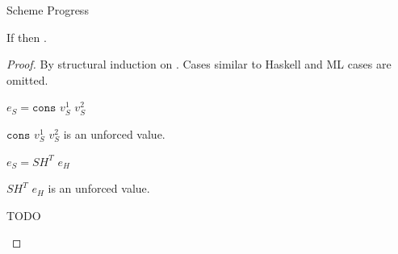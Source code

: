 \begin{theorem}{Scheme Progress}

\label{thmpss}

If \judes{}{\first{\varexps}}{\tytst} then \pshyp{\first{\varexps}}{\second{\varexps}}.

\begin{proof}

By structural induction on \first{\varexps}.  Cases similar to Haskell and ML cases are omitted.


\begin{case}

$e_{S}=\mathtt{cons}$ $v_{S}^{1}$ $v_{S}^{2}$

$\mathtt{cons}$ $v_{S}^{1}$ $v_{S}^{2}$ is an unforced value.

\end{case}


\begin{case}

$e_{S}=SH^{T}$ $e_{H}$

$SH^{T}$ $e_{H}$ is an unforced value.

TODO

\end{case}


\newcommand{\psfapps}{\expfapp{\first{\varexps}}{\second{\varexps}}}
\renewcommand{\x}{\expfabsd{\first{\varvars}}{\third{\varexps}}}

\begin{case}{\psfapps}

\pshypby
{\first{\varexps}}
{\third{\varexps}}
\pssub
{\first{\varexps}}
{\third{\varexps}}
{\psfapps}
{\expfapp{\third{\varexps}}{\second{\varexps}}}
\pserr
{\first{\varexps}}
{\psfapps}
\pshypby
{\second{\varexps}}
{\third{\varexps}}
\pssuband
{\second{\varexps}}
{\third{\varexps}}
{\first{\varexps}}
{\psfapps}
{\expfapp{\first{\varexps}}{\third{\varexps}}}
\pserrand
{\second{\varexps}}
{\first{\varexps}}
{\psfapps}
\psother
{\first{\varexps}}
{\second{\varexps}}
\psred
{\expfapp{(\x)}{\second{\varexps}}}
{\expsubst{\third{\varexps}}{\second{\varexps}}{\first{\varvars}}}
\psrednote
{\expfapp{\first{\varexps}}{\second{\varexps}}}
{\expwrongd{\errfun}}
{\first{\varexps} \neq \expfabsd{\first{\varvars}}{\third{\varexps}}}

\end{case}



\end{proof}
\end{theorem}
